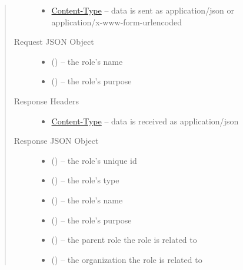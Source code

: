\documentclass[letterpaper,10pt,english]{sphinxmanual}
\begin{document}
\begin{fulllineitems}
\begin{quote}
\begin{description}
\begin{itemize}
\item {} 
\href{http://tools.ietf.org/html/rfc7231\#section-3.1.1.5}{Content-Type} -- data is sent as application/json or
application/x-www-form-urlencoded

\end{itemize}

\item[{Request JSON Object}] \leavevmode\begin{itemize}
\item {} 
 () -- the role's name

\item {} 
 () -- the role's purpose

\end{itemize}

\item[{Response Headers}] \leavevmode\begin{itemize}
\item {} 
\href{http://tools.ietf.org/html/rfc7231\#section-3.1.1.5}{Content-Type} -- data is received as application/json

\end{itemize}

\item[{Response JSON Object}] \leavevmode\begin{itemize}
\item {} 
 () -- the role's unique id

\item {} 
 () -- the role's type

\item {} 
 () -- the role's name

\item {} 
 () -- the role's purpose

\item {} 
 () -- the parent role the role is related to

\item {} 
 () -- the organization the role is related to


\end{itemize}
\end{description}
\end{quote}
\end{fulllineitems}
\end{document}

